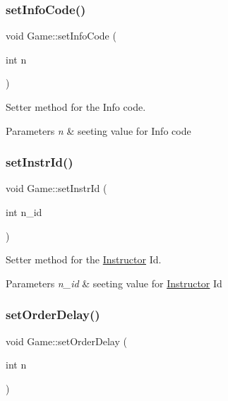 \subsubsection{\texorpdfstring{set\+Info\+Code()}{setInfoCode()}}
{\footnotesize\ttfamily void Game\+::set\+Info\+Code (\begin{DoxyParamCaption}\item[{int}]{n }\end{DoxyParamCaption})}



Setter method for the Info code. 


\begin{DoxyParams}{Parameters}
{\em n} & seeting value for Info code \\
\hline
\end{DoxyParams}
\mbox{\label{class_game_a7a704228c549b80d48d1b4fb5a8dd512}} 
\subsubsection{\texorpdfstring{set\+Instr\+Id()}{setInstrId()}}
{\footnotesize\ttfamily void Game\+::set\+Instr\+Id (\begin{DoxyParamCaption}\item[{int}]{n\+\_\+id }\end{DoxyParamCaption})}



Setter method for the \hyperlink{class_instructor}{Instructor} Id. 


\begin{DoxyParams}{Parameters}
{\em n\+\_\+id} & seeting value for \hyperlink{class_instructor}{Instructor} Id \\
\hline
\end{DoxyParams}
\mbox{\label{class_game_adf895b54f74b8d95c4f67b15cef75290}} 
\subsubsection{\texorpdfstring{set\+Order\+Delay()}{setOrderDelay()}}
{\footnotesize\ttfamily void Game\+::set\+Order\+Delay (\begin{DoxyParamCaption}\item[{int}]{n }\end{DoxyParamCaption})}



